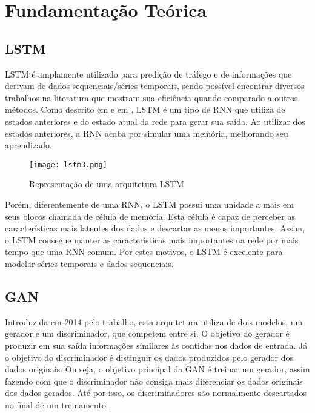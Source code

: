 
\section{Fundamentação Teórica}

\subsection {LSTM}

\acrfull{LSTM} é amplamente utilizado para predição de tráfego e de informações que derivam de dados sequenciais/séries temporais, sendo possível encontrar diversos trabalhos na literatura que mostram sua eficiência quando comparado a outros métodos. Como descrito em \cite{Zainab_2018} e em \cite{Xiaolei_2015}, \acrshort{LSTM} é um tipo de \acrfull{RNN} que utiliza de estados anteriores e do estado atual da rede para gerar sua saída. Ao utilizar dos estados anteriores, a \acrshort{RNN} acaba por simular uma memória, melhorando seu aprendizado. 

\begin{figure}[htbp]
    \centering
    \texttt{[image: lstm3.png]}
    \label{figure:eixo}
    \caption[Representação de uma arquitetura LSTM]{Representação de uma arquitetura LSTM\footnotemark}
\end{figure}


Porém, diferentemente de uma \acrshort{RNN}, o LSTM possui uma unidade a mais em seus blocos chamada de célula de memória. Esta célula é capaz de perceber as características mais latentes dos dados e descartar as menos importantes. Assim, o \acrshort{LSTM} consegue manter as características mais importantes na rede por mais tempo que uma \acrfull{RNN} comum. Por estes motivos, o \acrshort{LSTM} é excelente para modelar séries temporais e dados sequenciais.

\subsection {GAN}

Introduzida em 2014 pelo trabalho\cite{NIPS2014_5423}, esta arquitetura utiliza de dois modelos, um gerador e um discriminador, que competem entre si. O objetivo do gerador é produzir em sua saída informações similares às contidas nos dados de entrada. Já o objetivo do discriminador é distinguir os dados produzidos pelo gerador dos dados originais. Ou seja, o objetivo principal da \acrshort{GAN} é treinar um gerador, assim fazendo com que o discriminador não consiga mais diferenciar os dados originais dos dados gerados. Até por isso, os discriminadores são normalmente descartados no final de um treinamento \cite{turner2018metropolis}.

